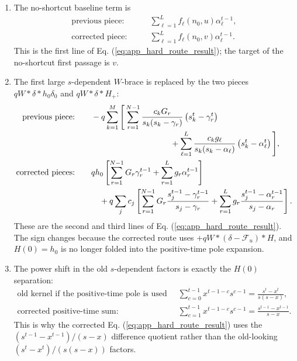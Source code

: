 \documentclass[superscriptaddress, amsmath, amssymb, aps, pre, floatfix]{revtex4-2}
\begin{document}
\begin{enumerate}
\item The no-shortcut baseline term is
\begin{align*}
\text{previous piece:}\qquad
&\sum_{\ell=1}^{L}f_\ell(n_0,u)\alpha_\ell^{t-1},\\
\text{corrected piece:}\qquad
&\sum_{\ell=1}^{L}f_\ell(n_0,v)\alpha_\ell^{t-1}.
\end{align*}
This is the first line of Eq. (\ref{eq:app_hard_route_result}); the target of the no-shortcut first passage is \(v\).

\item The first large \(s\)-dependent \(W\)-brace is replaced by the two pieces \(qW*\delta*h_0\delta_0\) and \(qW*\delta*H_+\):
\begin{align*}
\text{previous piece:}\qquad
&-q\sum_{k=1}^{M}\Bigg[
\sum_{r=1}^{N-1}
\frac{c_kG_r}{s_k(s_k-\gamma_r)}
\left(s_k^t-\gamma_r^t\right)
\nonumber\\[-1mm]
&\hspace{34mm}
+\sum_{\ell=1}^{L}
\frac{c_kg_\ell}{s_k(s_k-\alpha_\ell)}
\left(s_k^t-\alpha_\ell^t\right)
\Bigg],
\nonumber\\
\text{corrected pieces:}\qquad
&q h_0
\left[
\sum_{r=1}^{N-1}G_r\gamma_r^{t-1}
+\sum_{r=1}^{L}g_r\alpha_r^{t-1}
\right]
\nonumber\\
&\quad
+q\sum_j c_j
\left[
\sum_{r=1}^{N-1}G_r
\frac{s_j^{t-1}-\gamma_r^{t-1}}{s_j-\gamma_r}
+\sum_{r=1}^{L}g_r
\frac{s_j^{t-1}-\alpha_r^{t-1}}{s_j-\alpha_r}
\right].
\end{align*}
These are the second and third lines of Eq. (\ref{eq:app_hard_route_result}).  The sign changes because the corrected route uses \(+qW*(\delta-\mathcal F_u)*H\), and \(H(0)=h_0\) is no longer folded into the positive-time pole expansion.

\item The power shift in the old \(s\)-dependent factors is exactly the \(H(0)\) separation:
\begin{align*}
\text{old kernel if the positive-time pole is used at time zero:}\qquad
&\sum_{c=0}^{t-1}x^{t-1-c}s^{c-1}
=\frac{s^t-x^t}{s(s-x)},\\
\text{corrected positive-time sum:}\qquad
&\sum_{c=1}^{t-1}x^{t-1-c}s^{c-1}
=\frac{s^{t-1}-x^{t-1}}{s-x}.
\end{align*}
This is why the corrected Eq. (\ref{eq:app_hard_route_result}) uses the \((s^{t-1}-x^{t-1})/(s-x)\) difference quotient rather than the old-looking \((s^t-x^t)/(s(s-x))\) factors.


\end{enumerate}
\end{document}
